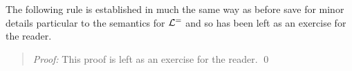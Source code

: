 
The following rule is established in much the same way as before save for minor details particular to the semantics for $\mathcal{L}^{=}$ and so has been left as an exercise for the reader. 


  
\begin{quote} 
  \textit{Proof:}
  This proof is left as an exercise for the reader.
  \qed
\end{quote}


%

